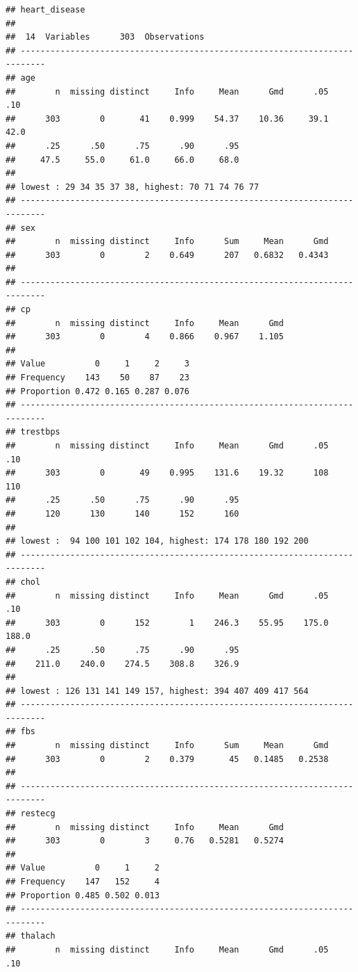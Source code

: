 \documentclass[]{article}
\begin{document}
\begin{verbatim}
## heart_disease 
## 
##  14  Variables      303  Observations
## ---------------------------------------------------------------------------
## age 
##        n  missing distinct     Info     Mean      Gmd      .05      .10 
##      303        0       41    0.999    54.37    10.36     39.1     42.0 
##      .25      .50      .75      .90      .95 
##     47.5     55.0     61.0     66.0     68.0 
## 
## lowest : 29 34 35 37 38, highest: 70 71 74 76 77
## ---------------------------------------------------------------------------
## sex 
##        n  missing distinct     Info      Sum     Mean      Gmd 
##      303        0        2    0.649      207   0.6832   0.4343 
## 
## ---------------------------------------------------------------------------
## cp 
##        n  missing distinct     Info     Mean      Gmd 
##      303        0        4    0.866    0.967    1.105 
##                                   
## Value          0     1     2     3
## Frequency    143    50    87    23
## Proportion 0.472 0.165 0.287 0.076
## ---------------------------------------------------------------------------
## trestbps 
##        n  missing distinct     Info     Mean      Gmd      .05      .10 
##      303        0       49    0.995    131.6    19.32      108      110 
##      .25      .50      .75      .90      .95 
##      120      130      140      152      160 
## 
## lowest :  94 100 101 102 104, highest: 174 178 180 192 200
## ---------------------------------------------------------------------------
## chol 
##        n  missing distinct     Info     Mean      Gmd      .05      .10 
##      303        0      152        1    246.3    55.95    175.0    188.0 
##      .25      .50      .75      .90      .95 
##    211.0    240.0    274.5    308.8    326.9 
## 
## lowest : 126 131 141 149 157, highest: 394 407 409 417 564
## ---------------------------------------------------------------------------
## fbs 
##        n  missing distinct     Info      Sum     Mean      Gmd 
##      303        0        2    0.379       45   0.1485   0.2538 
## 
## ---------------------------------------------------------------------------
## restecg 
##        n  missing distinct     Info     Mean      Gmd 
##      303        0        3     0.76   0.5281   0.5274 
##                             
## Value          0     1     2
## Frequency    147   152     4
## Proportion 0.485 0.502 0.013
## ---------------------------------------------------------------------------
## thalach 
##        n  missing distinct     Info     Mean      Gmd      .05      .10 

\end{verbatim}
\end{document}
